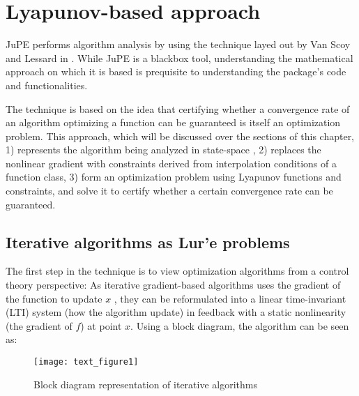 \chapter{Lyapunov-based approach}\label{chapter:lyapunov}

JuPE performs algorithm analysis by using the technique layed out by Van Scoy and Lessard in \cite{tutorial}. While JuPE is a blackbox tool, understanding the mathematical approach on which it is based is  prequisite to understanding the package's code and functionalities.

The technique is based on the idea that certifying whether a convergence rate of an algorithm optimizing a function can be guaranteed is itself an optimization problem. This approach, which will be discussed over the sections of this chapter, 1) represents the algorithm being analyzed in state-space , 2) replaces the nonlinear gradient with constraints derived from interpolation conditions of a function class, 3) form an optimization problem using Lyapunov functions and constraints, and  solve it to certify whether a certain convergence rate can be guaranteed.
\section{Iterative algorithms as Lur'e problems}

The first step in the technique is to view optimization algorithms from a control theory perspective: As  iterative gradient-based algorithms uses the gradient of the function to update \(x\) , they can be reformulated into a linear time-invariant (LTI) system (how the algorithm update) in feedback with a static nonlinearity (the gradient of \(f\)) at point \(x\). Using a block diagram, the algorithm can be seen as: 

\begin{figure}[h]
    \centering
	\texttt{[image: text\_figure1]}
    \caption{Block diagram representation of iterative algorithms}
    \label{plot_block_diagram}
\end{figure}

